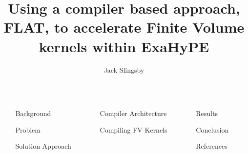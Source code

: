 \documentclass[final]{beamer}
\title{Using a compiler based approach, FLAT, to accelerate Finite Volume kernels within ExaHyPE}
\author{Jack Slingsby}
\newlength{\sepwidth}
\newlength{\colwidth}
\newcommand{\separatorcolumn}{\begin{column}{\sepwidth}\end{column}}
\begin{document}
\begin{frame}[t]
\begin{columns}[t]
\separatorcolumn

\begin{column}{\colwidth}

  \begin{block}{Background}

     

  \end{block}

  \begin{block}{Problem}

    

  \end{block}
  
  \begin{block}{Solution Approach}

    

  \end{block}

\end{column}

\separatorcolumn

\begin{column}{\colwidth}

  \begin{block}{Compiler Architecture}

    

  \end{block}
  \begin{block}{Compiling FV Kernels}

   

  \end{block}

\end{column}

\separatorcolumn

\begin{column}{\colwidth}

  \begin{block}{Results}

   

  \end{block}

  \begin{block}{Conclusion}

    

  \end{block}

  \begin{block}{References}

    \nocite{*}
    \footnotesize{}

  \end{block}

\end{column}

\separatorcolumn
\end{columns}
\end{frame}
\end{document}
